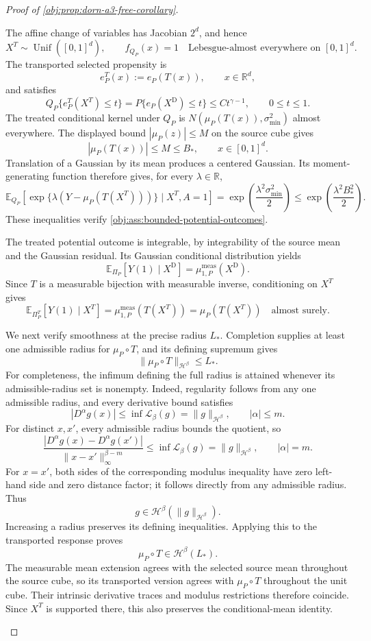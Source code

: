 \begin{proof}[Proof of \cref{obj:prop:dorn-a3-free-corollary}]
\begin{enumerate}
The affine change of variables has Jacobian \(2^d\), and hence
\[
X^T\sim\operatorname{Unif}([0,1]^d),
\qquad
f_{Q_P}(x)=1
\quad\text{Lebesgue-almost everywhere on }[0,1]^d.
\]
The transported selected propensity is
\[
e_P^T(x):=e_P(T(x)),
\qquad x\in\mathbb R^d,
\]
and satisfies
\[
Q_P\{e_P^T(X^T)\le t\}
=
P\{e_P(X^{\mathrm D})\le t\}
\le Ct^{\gamma-1},
\qquad 0\le t\le1.
\]
The treated conditional kernel under \(Q_P\) is
\(N(\mu_P(T(x)),\sigma_{\min}^2)\) almost everywhere. The displayed bound \(|\mu_P(z)|\le M\) on the source cube gives
\[
|\mu_P(T(x))|\le M\le B_*,
\qquad x\in[0,1]^d.
\]
Translation of a Gaussian by its mean produces a centered Gaussian. Its moment-generating function therefore gives, for every \(\lambda\in\mathbb R\),
\[
\mathbb E_{Q_P}\!\left[
\exp\{\lambda(Y-\mu_P(T(X^T)))\}
\mid X^T,A=1
\right]
=
\exp\!\left(\frac{\lambda^2\sigma_{\min}^2}{2}\right)
\le
\exp\!\left(\frac{\lambda^2B_*^2}{2}\right).
\]
These inequalities verify \cref{obj:ass:bounded-potential-outcomes}.

The treated potential outcome is integrable, by integrability of the source mean and the Gaussian residual. Its Gaussian conditional distribution yields
\[
\mathbb E_{\Pi_P}[Y(1)\mid X^{\mathrm D}]
=
\mu_{1,P}^{\mathrm{meas}}(X^{\mathrm D}).
\]
Since \(T\) is a measurable bijection with measurable inverse, conditioning on \(X^T\) gives
\[
\mathbb E_{\Pi_P^T}[Y(1)\mid X^T]
=
\mu_{1,P}^{\mathrm{meas}}(T(X^T))
=
\mu_P(T(X^T))
\quad\text{almost surely}.
\]

We next verify smoothness at the precise radius \(L_*\). Completion supplies at least one admissible radius for \(\mu_P\circ T\), and its defining supremum gives
\[
\|\mu_P\circ T\|_{\mathcal H^\beta}\le L_*.
\]
For completeness, the infimum defining the full radius is attained whenever its admissible-radius set is nonempty. Indeed, regularity follows from any one admissible radius, and every derivative bound satisfies
\[
|D^\alpha g(x)|
\le
\inf\mathscr L_\beta(g)
=
\|g\|_{\mathcal H^\beta},
\qquad |\alpha|\le m.
\]
For distinct \(x,x'\), every admissible radius bounds the quotient, so
\[
\frac{|D^\alpha g(x)-D^\alpha g(x')|}
{\|x-x'\|_\infty^{\beta-m}}
\le
\inf\mathscr L_\beta(g)
=
\|g\|_{\mathcal H^\beta},
\qquad |\alpha|=m.
\]
For \(x=x'\), both sides of the corresponding modulus inequality have zero left-hand side and zero distance factor; it follows directly from any admissible radius. Thus
\[
g\in\mathcal H^\beta(\|g\|_{\mathcal H^\beta}).
\]
Increasing a radius preserves its defining inequalities. Applying this to the transported response proves
\[
\mu_P\circ T\in\mathcal H^\beta(L_*).
\]
The measurable mean extension agrees with the selected source mean throughout the source cube, so its transported version agrees with \(\mu_P\circ T\) throughout the unit cube. Their intrinsic derivative traces and modulus restrictions therefore coincide. Since \(X^T\) is supported there, this also preserves the conditional-mean identity.


\end{enumerate}
\end{proof}
